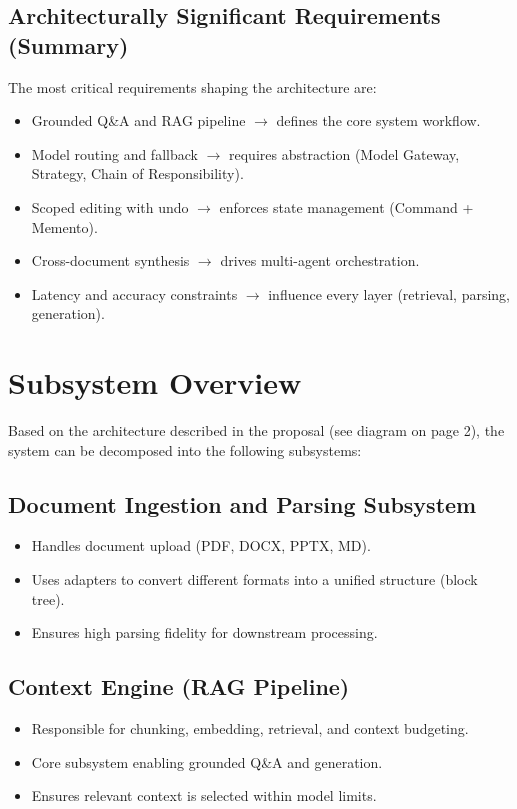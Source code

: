 \documentclass[12pt]{article}
\begin{document}
\subsection{Architecturally Significant Requirements (Summary)}

The most critical requirements shaping the architecture are:

\begin{itemize}
   \item Grounded Q\&A and RAG pipeline $\rightarrow$ defines the core system workflow.
   \item Model routing and fallback $\rightarrow$ requires abstraction (Model Gateway, Strategy, Chain of Responsibility).
   \item Scoped editing with undo $\rightarrow$ enforces state management (Command + Memento).
   \item Cross-document synthesis $\rightarrow$ drives multi-agent orchestration.
   \item Latency and accuracy constraints $\rightarrow$ influence every layer (retrieval, parsing, generation).
\end{itemize}

\section{Subsystem Overview}

Based on the architecture described in the proposal (see diagram on page 2), the system can be decomposed into the following subsystems:

\subsection{Document Ingestion and Parsing Subsystem}
\begin{itemize}
   \item Handles document upload (PDF, DOCX, PPTX, MD).
   \item Uses adapters to convert different formats into a unified structure (block tree).
   \item Ensures high parsing fidelity for downstream processing.
\end{itemize}

\subsection{Context Engine (RAG Pipeline)}
\begin{itemize}
   \item Responsible for chunking, embedding, retrieval, and context budgeting.
   \item Core subsystem enabling grounded Q\&A and generation.
   \item Ensures relevant context is selected within model limits.
\end{itemize}
\end{document}
